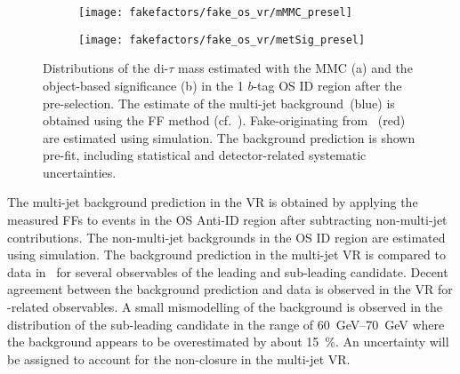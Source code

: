 
\begin{figure}[htbp]
  \centering

  \begin{subfigure}{0.44\textwidth}
    \texttt{[image: fakefactors/fake\_os\_vr/mMMC\_presel]}
    \subcaption{}
  \end{subfigure}\hspace*{0.04\textwidth}%
  \begin{subfigure}{0.44\textwidth}
    \texttt{[image: fakefactors/fake\_os\_vr/metSig\_presel]}
    \subcaption{}
  \end{subfigure}

  \caption[Distributions of \mMMC and the object-based \pTmissAbs significance
  in the 1 $b$-tag OS ID region.]{Distributions of the di-$\tau$ mass estimated
    with the MMC (a) and the object-based \pTmissAbs significance (b) in the 1
    $b$-tag OS ID region after the pre-selection. The estimate of the multi-jet
    background~(blue) is obtained using the FF method
    (cf.~). Fake-\tauhadvis originating from
    \ttbar~(red) are estimated using simulation. The background prediction is
    shown pre-fit, including statistical and detector-related systematic
    uncertainties.}%
  \label{fig:fake_factor_OSVR_cutvars}
\end{figure}

The multi-jet background prediction in the VR is obtained by applying the
measured FFs to events in the OS Anti-ID region after subtracting non-multi-jet
contributions. The non-multi-jet backgrounds in the OS ID region are estimated
using simulation. The background prediction in the multi-jet VR is compared to
data in~ for several observables of the
leading and sub-leading \tauhadvis candidate. Decent agreement between the
background prediction and data is observed in the VR for \tauhadvis-related
observables. A small mismodelling of the background is observed in the \pT
distribution of the sub-leading \tauhadvis candidate in the range of
\SIrange{60}{70}{\GeV} where the background appears to be overestimated by about
\SI{15}{\percent}. An uncertainty will be assigned to account for the
non-closure in the multi-jet VR.

